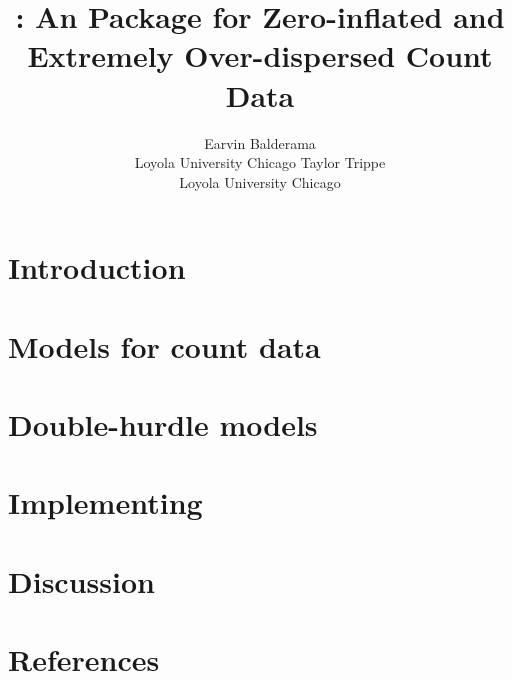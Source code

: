 \documentclass[article]{jss}
\author{Earvin Balderama\\Loyola University Chicago \And 
        Taylor Trippe\\Loyola University Chicago}
\title{\pkg{hurdlr}: An \proglang{R} Package for Zero-inflated and Extremely Over-dispersed Count Data}
\begin{document}



\section{Introduction}

\section{Models for count data}

\section{Double-hurdle models}

\section[Implementing hurdlr]{Implementing }


\section{Discussion}


\section*{References}
\end{document}
